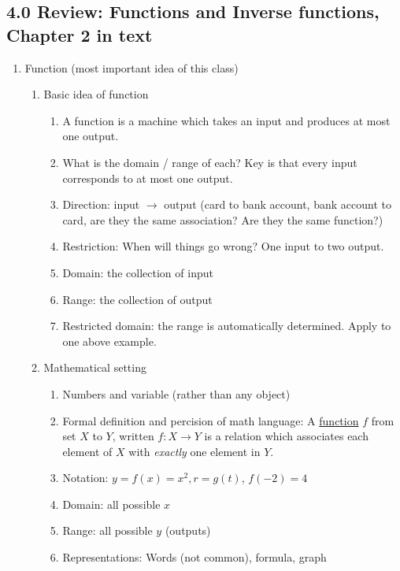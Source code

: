 \documentclass{article}
\begin{document}
\subsection{4.0 Review: Functions and Inverse functions, Chapter 2 in text}
\begin{enumerate}

\item Function (most important idea of this class)
\begin{enumerate}

\item Basic idea of function
\begin{enumerate}
\item A function is a machine which takes an input and produces at most one output.
\item What is the domain / range of each? Key is that every input corresponds to at most one output.
\item Direction: input $\rightarrow$ output (card to bank account, bank account to card, are they the same association? Are they the same function?)
\item Restriction: When will things go wrong? One input to two output.
\item Domain: the collection of input
\item Range: the collection of output
\item Restricted domain: the range is automatically determined. Apply to one above example.
\end{enumerate}

\item Mathematical setting
\begin{enumerate}
\item Numbers and variable (rather than any object)
\item Formal definition and percision of math language:  	A \underline{function} $f$ from set $X$ to $Y$, written $f:X\rightarrow Y$ is a relation which associates each element of $X$ with \emph{exactly} one element in $Y$. 
\item Notation: $y = f(x)= x^2, r = g(t)$, $f(-2)=4$
\item Domain: all possible $x$ 
\item Range: all possible $y$ (outputs)
\item Representations: Words (not common), formula, graph
\end{enumerate}


\end{enumerate}
\end{enumerate}
\end{document}

